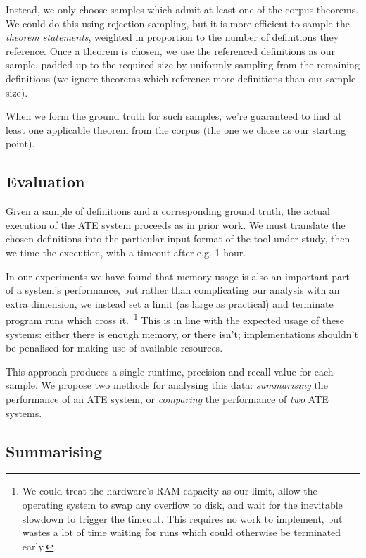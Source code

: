 Instead, we only choose samples which admit at least one of the corpus theorems.
We could do this using rejection sampling, but it is more efficient to sample
the \emph{theorem statements}, weighted in proportion to the number of
definitions they reference. Once a theorem is chosen, we use the referenced
definitions as our sample, padded up to the required size by uniformly sampling
from the remaining definitions (we ignore theorems which reference more
definitions than our sample size).

When we form the ground truth for such samples, we're guaranteed to find at
least one applicable theorem from the corpus (the one we chose as our starting
point).

\subsection{Evaluation}

Given a sample of definitions and a corresponding ground truth, the actual
execution of the ATE system proceeds as in prior work. We must translate the
chosen definitions into the particular input format of the tool under study,
then we time the execution, with a timeout after e.g. 1 hour.

In our experiments we have found that memory usage is also an important part of
a system's performance, but rather than complicating our analysis with an extra
dimension, we instead set a limit (as large as practical) and terminate program
runs which cross it.~\footnote{We could treat the hardware's RAM capacity as our
  limit, allow the operating system to swap any overflow to disk, and wait for
  the inevitable slowdown to trigger the timeout. This requires no work to
  implement, but wastes a lot of time waiting for runs which could otherwise be
  terminated early.} This is in line with the expected usage of these systems:
either there is enough memory, or there isn't; implementations shouldn't be
penalised for making use of available resources.

This approach produces a single runtime, precision and recall value for each
sample. We propose two methods for analysing this data: \emph{summarising}
the performance of an ATE system, or \emph{comparing} the performance of
\emph{two} ATE systems.

\subsection{Summarising}

